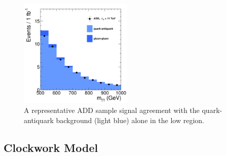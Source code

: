 \begin{figure}[htbp!]
\caption{A representative ADD sample signal agreement with the quark-antiquark background (light blue) alone in the low \mgg region.}
\begin{center}
\includegraphics[angle=0,width=0.48\textwidth]{fig/GG_bkg_sub-1.png}
\end{center}
\label{fig:ADDsignal_and_GG}
\end{figure}




\subsection{Clockwork Model}


